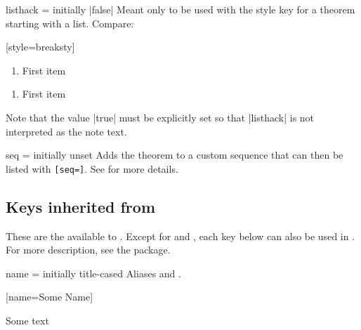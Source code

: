 \documentclass{ltxdoc}
\newcommand{\bracks}[1]{\texttt{[#1]}}
\begin{document}
\begin{docKey}{listhack}
  {=\textbar{}}
  {initially |false|}
Meant only to be used with the  style key for a theorem starting with a list. Compare:

\begin{tcbwritetemp}
[style=breaksty]
\end{tcbwritetemp}

\begin{keythmscode}[withpreamble]
\begin{observation}
\begin{enumerate}
\item First item
\end{enumerate}
\end{observation}

\begin{observation}[listhack=true]
\begin{enumerate}
\item First item
\end{enumerate}
\end{observation}
\end{keythmscode}

Note that the value |true| must be explicitly set so that |listhack| is not interpreted as the note text.
\end{docKey}

\begin{docKey}[][doc label=thm/seq]{seq}
  {=}
  {initially unset}
Adds the theorem to a custom sequence  that can then be listed with \bracks{seq=}. See  for more details.
\end{docKey}

\subsection{Keys inherited from } \label{thm-thmtools-keys}

These are the  available to . Except for  and , each key below can also be used in . For more description, see the \href{https://ctan.org/pkg/thmtools}{} package.

\begin{docKey}[][doc label=thm/name]{name}
  {=}
  {initially title-cased }
Aliases  and .

\begin{tcbwritetemp}
[name=Some Name]
\end{tcbwritetemp}

\begin{keythmscode}[withpreamble]
\begin{mythm}
Some text
\end{mythm}
\end{keythmscode}

\end{docKey}
\end{document}
